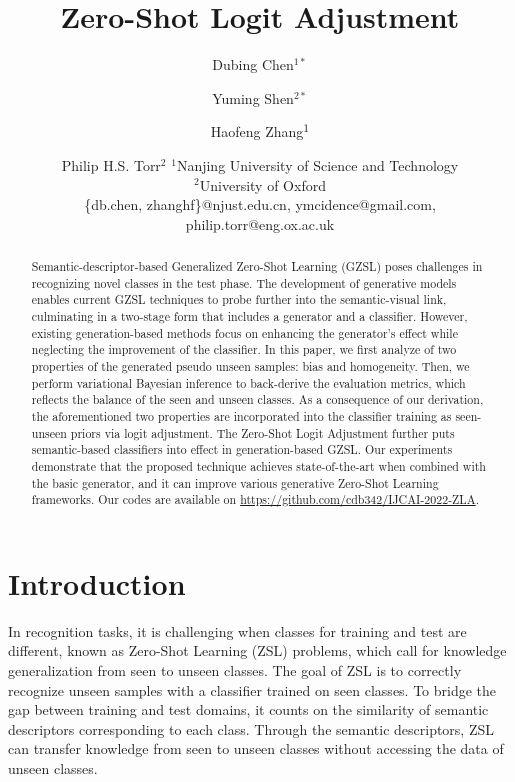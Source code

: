 \documentclass{article}
\title{Zero-Shot Logit Adjustment}
\author{
	Dubing Chen$^{1*}$
	\and
	Yuming Shen$^{2*}$\and
	Haofeng Zhang\textsuperscript{$1$\Letter}\and
	Philip H.S. Torr$^2$
	\affiliations
	$^1$Nanjing University of Science and Technology\\
	$^2$University of Oxford\\
	\emails
	\{db.chen, zhanghf\}@njust.edu.cn,
	ymcidence@gmail.com,
	philip.torr@eng.ox.ac.uk
}
\begin{document}
	\maketitle
	
	\begin{abstract}
		Semantic-descriptor-based Generalized Zero-Shot Learning (GZSL) poses challenges in recognizing novel classes in the test phase. The development of generative models enables current GZSL techniques to probe further into the semantic-visual link, culminating in a two-stage form that includes a generator and a classifier. However, existing generation-based methods focus on enhancing the generator's effect while neglecting the improvement of the classifier. In this paper, we first analyze of two properties of the generated pseudo unseen samples: bias and homogeneity. Then, we perform variational Bayesian inference to back-derive the evaluation metrics, which reflects the balance of the seen and unseen classes. As a consequence of our derivation, the aforementioned two properties are incorporated into the classifier training as seen-unseen priors via logit adjustment. The Zero-Shot Logit Adjustment further puts semantic-based classifiers into effect in generation-based GZSL. Our experiments demonstrate that the proposed technique achieves state-of-the-art when combined with the basic generator, and it can improve various generative Zero-Shot Learning frameworks. Our codes are available on \url{https://github.com/cdb342/IJCAI-2022-ZLA}.
	\end{abstract}
		\section{Introduction}

	In recognition tasks, it is challenging when classes for training and test are different, known as Zero-Shot Learning (ZSL) problems, which call for knowledge generalization from seen to unseen classes. The goal of ZSL is to correctly recognize unseen samples with a classifier trained on seen classes. To bridge the gap between training and test domains, it counts on the similarity of semantic descriptors \cite{lampert2009learning} corresponding to each class.\let\thefootnote\relax{} 
        \let\thefootnote\relax{}Through the semantic descriptors, ZSL can transfer knowledge from seen to unseen classes without accessing the data of unseen classes.
\end{document}
